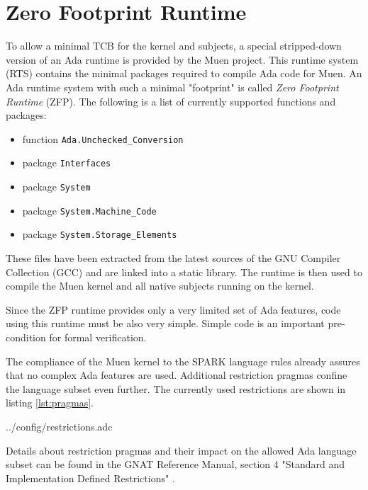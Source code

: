 \section{Zero Footprint Runtime}\label{sec:zfp-rts}
To allow a minimal TCB for the kernel and subjects, a special stripped-down
version of an Ada runtime is provided by the Muen project. This
runtime system (RTS) contains the minimal packages required to
compile Ada code for Muen. An Ada runtime system with such a minimal
"footprint" is called \emph{Zero Footprint Runtime} (ZFP). The
following is a list of currently supported functions and packages:

\begin{itemize}
	\item function \texttt{Ada.Unchecked\_Conversion}
	\item package \texttt{Interfaces}
	\item package \texttt{System}
	\item package \texttt{System.Machine\_Code}
	\item package \texttt{System.Storage\_Elements}
\end{itemize}

These files have been extracted from the latest sources of the GNU Compiler
Collection (GCC) \cite{gcc} and are linked into a static library.
The runtime is then used to compile the Muen kernel and all native subjects
running on the kernel.

Since the ZFP runtime provides only a very limited set of Ada features, code
using this runtime must be also very simple. Simple code is an important
pre-condition for formal verification.

The compliance of the Muen kernel to the SPARK language rules
already assures that no complex Ada features are used. Additional restriction
pragmas confine the language subset even further. The currently
used restrictions are shown in listing \ref{lst:pragmas}.


	{../config/restrictions.adc}

Details about restriction pragmas and their impact on the allowed Ada language
subset can be found in the GNAT Reference Manual, section 4 "Standard and
Implementation Defined Restrictions" \cite{GNAT:manual}.
